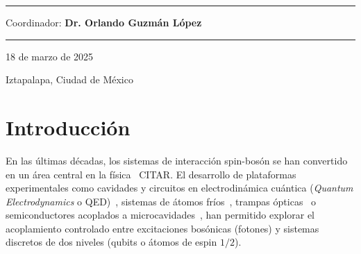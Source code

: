 \documentclass[onecolumn,notitlepage,letterpaper,aps,pra,12pt]{article}
\numberwithin{equation}{section}
\begin{document}
\begin{titlepage}
\vspace{1cm}
\rule{5cm}{0.3mm}

\vspace{0.45cm}
{\large Coordinador: \textbf{Dr. Orlando Guzmán López}  \par}

{\LARGE \rule{15cm}{1.0mm}  \par}

\vspace{0.4cm}

{\large 18 de marzo de 2025 \par}
\vspace{0.1cm}
{\large Iztapalapa, Ciudad de México \par}
\end{titlepage}

\clearpage
\tableofcontents
\clearpage
\newpage



\section{Introducción}



En las últimas décadas, los sistemas de interacción spin-bosón se han convertido en un área central en la física~\cite{haroche2006} CITAR. El desarrollo de plataformas experimentales como cavidades y circuitos en electrodinámica cuántica (\textit{Quantum Electrodynamics} o QED)~\cite{Blais2021,Clerk2020}, sistemas de átomos fríos~\cite{Mekhov2012}, trampas ópticas~\cite{Yuanjie2021} o semiconductores acoplados a microcavidades~\cite{Schneider2018}, han permitido explorar el acoplamiento controlado entre excitaciones bosónicas (fotones) y sistemas discretos de dos niveles (qubits o átomos de espin $1/2$). %
\end{document}
